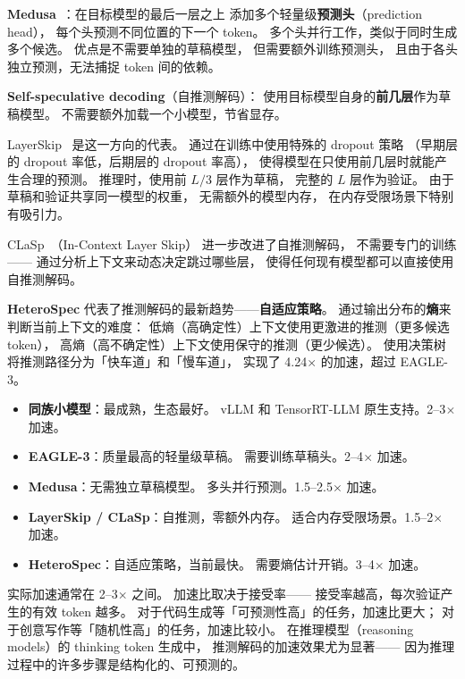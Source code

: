 \textbf{Medusa}~\cite{cai2024medusa}：在目标模型的最后一层之上
添加多个轻量级\textbf{预测头}（prediction head），
每个头预测不同位置的下一个 token。
多个头并行工作，类似于同时生成多个候选。
优点是不需要单独的草稿模型，
但需要额外训练预测头，
且由于各头独立预测，无法捕捉 token 间的依赖。

\textbf{Self-speculative decoding}（自推测解码）：
使用目标模型自身的\textbf{前几层}作为草稿模型。
不需要额外加载一个小模型，节省显存。

LayerSkip~\cite{elhoushi2024layerskip} 是这一方向的代表。
通过在训练中使用特殊的 dropout 策略
（早期层的 dropout 率低，后期层的 dropout 率高），
使得模型在只使用前几层时就能产生合理的预测。
推理时，使用前 $L/3$ 层作为草稿，
完整的 $L$ 层作为验证。
由于草稿和验证共享同一模型的权重，
无需额外的模型内存，
在内存受限场景下特别有吸引力。

CLaSp~\cite{chen2025clasp}（In-Context Layer Skip）
进一步改进了自推测解码，
不需要专门的训练——
通过分析上下文来动态决定跳过哪些层，
使得任何现有模型都可以直接使用自推测解码。

\textbf{HeteroSpec} 代表了推测解码的最新趋势——\textbf{自适应策略}。
通过输出分布的\textbf{熵}来判断当前上下文的难度：
低熵（高确定性）上下文使用更激进的推测（更多候选 token），
高熵（高不确定性）上下文使用保守的推测（更少候选）。
使用决策树将推测路径分为「快车道」和「慢车道」，
实现了 4.24$\times$ 的加速，超过 EAGLE-3。

\begin{keybox}[推测解码方法速查（2026 年初）]
\begin{itemize}[noitemsep]
  \item \textbf{同族小模型}：最成熟，生态最好。
        vLLM 和 TensorRT-LLM 原生支持。2--3$\times$ 加速。
  \item \textbf{EAGLE-3}：质量最高的轻量级草稿。
        需要训练草稿头。2--4$\times$ 加速。
  \item \textbf{Medusa}：无需独立草稿模型。
        多头并行预测。1.5--2.5$\times$ 加速。
  \item \textbf{LayerSkip / CLaSp}：自推测，零额外内存。
        适合内存受限场景。1.5--2$\times$ 加速。
  \item \textbf{HeteroSpec}：自适应策略，当前最快。
        需要熵估计开销。3--4$\times$ 加速。
\end{itemize}
\end{keybox}

实际加速通常在 2--3$\times$ 之间。
加速比取决于接受率——
接受率越高，每次验证产生的有效 token 越多。
对于代码生成等「可预测性高」的任务，加速比更大；
对于创意写作等「随机性高」的任务，加速比较小。
在推理模型（reasoning models）的 thinking token 生成中，
推测解码的加速效果尤为显著——
因为推理过程中的许多步骤是结构化的、可预测的。

